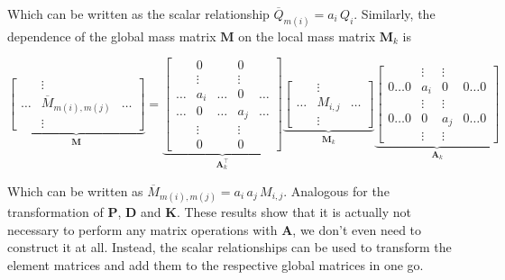 Which can be written as the scalar relationship $\overline{Q}_{m(i)} = a_{i}\,Q_{i}$.
Similarly, the dependence of the global mass matrix $\boldsymbol{M}$ on the local mass matrix $\boldsymbol{M}_{k}$ is

$$
\underbrace{
\begin{bmatrix}
& \vdots & \\
\hdots & \overline{M}_{m(i),m(j)} & \hdots \\
& \vdots &
\end{bmatrix}
}_{\boldsymbol{M}}
=
\underbrace{
\begin{bmatrix}
& 0 & & 0 & \\
& \vdots & & \vdots & \\
\hdots & a_{i} & \hdots & 0 & \hdots \\
\hdots & 0 & \hdots & a_{j} & \hdots \\
& \vdots & & \vdots & \\
& 0 & & 0 &
\end{bmatrix}
}_{\boldsymbol{A}_{k}^\intercal}
\underbrace{
\begin{bmatrix}
& \vdots & \\
\hdots & M_{i,j} & \hdots \\
& \vdots &
\end{bmatrix}
}_{\boldsymbol{M}_{k}}
\underbrace{
\begin{bmatrix}
& \vdots & \vdots & \\
0 \hdots 0 & a_{i} & 0 & 0 \hdots 0 \\
& \vdots & \vdots & \\
0 \hdots 0 & 0 & a_{j} & 0 \hdots 0 \\
& \vdots & \vdots &
\end{bmatrix}
}_{\boldsymbol{A}_{k}}
$$

Which can be written as $\overline{M}_{m(i),m(j)} = a_{i}\,a_{j}\,M_{i,j}$.
Analogous for the transformation of $\boldsymbol{P}$, $\boldsymbol{D}$ and $\boldsymbol{K}$.
These results show that it is actually not necessary to perform any matrix operations with $\boldsymbol{A}$, we don't even need to construct it at all.
Instead, the scalar relationships can be used to transform the element matrices and add them to the respective global matrices in one go.

%
%
%
%
%
%
%
%
%
%
%

